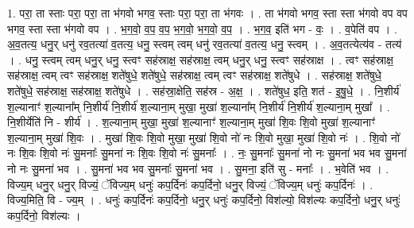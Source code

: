 \documentclass[17pt]{extarticle}
\begin{document}
1. परा॒ ता स्ताः परा॒ परा॒ ता भ॑गवो भगव॒ स्ताः परा॒ परा॒ ता भ॑गवः । . ता भ॑गवो भगव॒ स्ता स्ता भ॑गवो वप वप भगव॒ स्ता स्ता भ॑गवो वप । . भ॒ग॒वो॒ व॒प॒ व॒प॒ भ॒ग॒वो॒ भ॒ग॒वो॒ व॒प॒ । . भ॒ग॒व॒ इति॑ भग - वः॒ । . व॒पेति॑ वप । . अ॒व॒तत्य॒ धनु॒र् धनु॑ रव॒तत्या॑ व॒तत्य॒ धनु॒ स्त्वम् त्वम् धनु॑ रव॒तत्या॑ व॒तत्य॒ धनु॒ स्त्वम् । . अ॒व॒तत्येत्य॑व - तत्य॑ । . धनु॒ स्त्वम् त्वम् धनु॒र् धनु॒ स्त्वꣳ सह॑स्राक्ष॒ सह॑स्राक्ष॒ त्वम् धनु॒र् धनु॒ स्त्वꣳ सह॑स्राक्ष । . त्वꣳ सह॑स्राक्ष॒ सह॑स्राक्ष॒ त्वम् त्वꣳ सह॑स्राक्ष॒ शते॑षुधे॒ शते॑षुधे॒ सह॑स्राक्ष॒ त्वम् 
त्वꣳ सह॑स्राक्ष॒ शते॑षुधे । . सह॑स्राक्ष॒ शते॑षुधे॒ शते॑षुधे॒ सह॑स्राक्ष॒ सह॑स्राक्ष॒ शते॑षुधे । . सह॑स्रा॒क्षेति॒ सह॑स्र - अ॒क्ष॒ । . शते॑षुध॒ इति॒ शत॑ - इ॒षु॒धे॒ । . नि॒शीर्य॑ श॒ल्यानाꣳ॑ श॒ल्याना᳚म् नि॒शीर्य॑ नि॒शीर्य॑ श॒ल्याना॒म् मुखा॒ मुखा॑ श॒ल्याना᳚म् नि॒शीर्य॑ नि॒शीर्य॑ श॒ल्याना॒म् मुखा᳚ । . नि॒शीर्येति॑ नि - शीर्य॑ । . श॒ल्याना॒म् मुखा॒ मुखा॑ श॒ल्यानाꣳ॑ श॒ल्याना॒म् मुखा॑ शि॒वः शि॒वो मुखा॑ श॒ल्यानाꣳ॑ श॒ल्याना॒म् मुखा॑ शि॒वः । . मुखा॑ शि॒वः शि॒वो मुखा॒ मुखा॑ शि॒वो नो॑ नः शि॒वो मुखा॒ मुखा॑ शि॒वो नः॑ । . शि॒वो नो॑ नः शि॒वः शि॒वो नः॑ सु॒मनाः᳚ सु॒मना॑ नः शि॒वः शि॒वो नः॑ सु॒मनाः᳚ । . नः॒ सु॒मनाः᳚ सु॒मना॑ नो नः सु॒मना॑ भव भव सु॒मना॑ नो नः सु॒मना॑ भव । . सु॒मना॑ भव भव सु॒मनाः᳚ सु॒मना॑ भव । . सु॒मना॒ इति॑ सु - मनाः᳚ । . भ॒वेति॑ भव । . विज्य॒म् धनु॒र् धनु॒र् विज्यं॒ ॅविज्य॒म् धनुः॑ कप॒र्दिनः॑ कप॒र्दिनो॒ धनु॒र् विज्यं॒ ॅविज्य॒म् धनुः॑ कप॒र्दिनः॑ । . विज्य॒मिति॒ वि - ज्य॒म् । . धनुः॑ कप॒र्दिनः॑ कप॒र्दिनो॒ धनु॒र् धनुः॑ कप॒र्दिनो॒ विश॑ल्यो॒ विश॑ल्यः कप॒र्दिनो॒ धनु॒र् धनुः॑ कप॒र्दिनो॒ विश॑ल्यः । \newline
\end{document}
